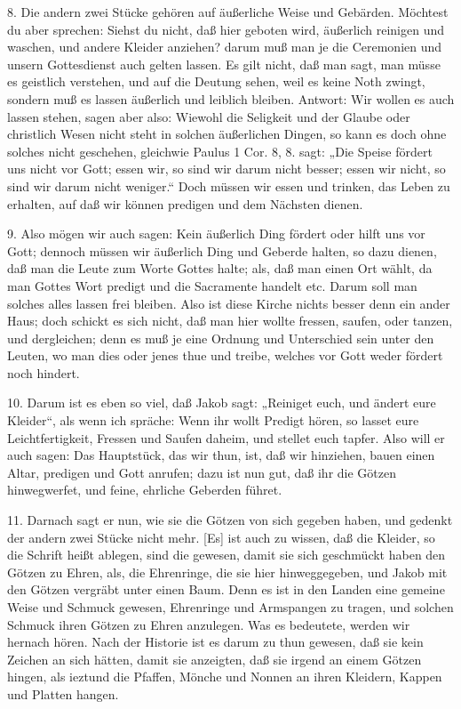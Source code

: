 8. Die andern zwei Stücke gehören auf äußerliche Weise und Gebärden. Möchtest du aber sprechen: Siehst du nicht, daß hier geboten wird, äußerlich reinigen und waschen, und andere Kleider anziehen? darum muß man je die Ceremonien und unsern Gottesdienst auch gelten lassen. Es gilt nicht, daß man sagt, man müsse es geistlich verstehen, und auf die Deutung sehen, weil es keine Noth zwingt, sondern muß es lassen äußerlich und leiblich bleiben. Antwort: Wir wollen es auch lassen stehen, sagen aber also: Wiewohl die Seligkeit und der Glaube oder christlich Wesen nicht steht in solchen äußerlichen Dingen, so kann es doch ohne solches nicht geschehen, gleichwie Paulus 1 Cor. 8, 8. sagt: „Die Speise fördert uns nicht vor Gott; essen wir, so sind wir darum nicht besser; essen wir nicht, so sind wir darum nicht weniger.“ Doch müssen wir essen und trinken, das Leben zu erhalten, auf daß wir können predigen und dem Nächsten dienen.

9. Also mögen wir auch sagen: Kein äußerlich Ding fördert oder hilft uns vor Gott; dennoch müssen wir äußerlich Ding und Geberde halten, so dazu dienen, daß man die Leute zum Worte Gottes halte; als, daß man einen Ort wählt, da man Gottes Wort predigt und die Sacramente handelt etc. Darum soll man solches alles lassen frei bleiben. Also ist diese Kirche nichts besser denn ein ander Haus; doch schickt es sich nicht, daß man hier wollte fressen, saufen, oder tanzen, und dergleichen; denn es muß je eine Ordnung und Unterschied sein unter den Leuten, wo man dies oder jenes thue und treibe, welches vor Gott weder fördert noch hindert.

10. Darum ist es eben so viel, daß Jakob sagt: „Reiniget euch, und ändert eure Kleider“, als wenn ich spräche: Wenn ihr wollt Predigt hören, so lasset eure Leichtfertigkeit, Fressen und Saufen daheim, und stellet euch tapfer. Also will er auch sagen: Das Hauptstück, das wir thun, ist, daß wir hinziehen, bauen einen Altar, predigen und Gott anrufen; dazu ist nun gut, daß ihr die Götzen hinwegwerfet, und feine, ehrliche Geberden führet.

11. Darnach sagt er nun, wie sie die Götzen von sich gegeben haben, und gedenkt der andern zwei Stücke nicht mehr. [Es] ist auch zu wissen, daß die Kleider, so die Schrift heißt ablegen, sind die gewesen, damit sie sich geschmückt haben den Götzen zu Ehren, als, die Ehrenringe, die sie hier hinweggegeben, und Jakob mit den Götzen vergräbt unter einen Baum. Denn es ist in den Landen eine gemeine Weise und Schmuck gewesen, Ehrenringe und Armspangen zu tragen, und solchen Schmuck ihren Götzen zu Ehren anzulegen. Was es bedeutete, werden wir hernach hören. Nach der Historie ist es darum zu thun gewesen, daß sie kein Zeichen an sich hätten, damit sie anzeigten, daß sie irgend an einem Götzen hingen, als ieztund die Pfaffen, Mönche und Nonnen an ihren Kleidern, Kappen und Platten hangen.

